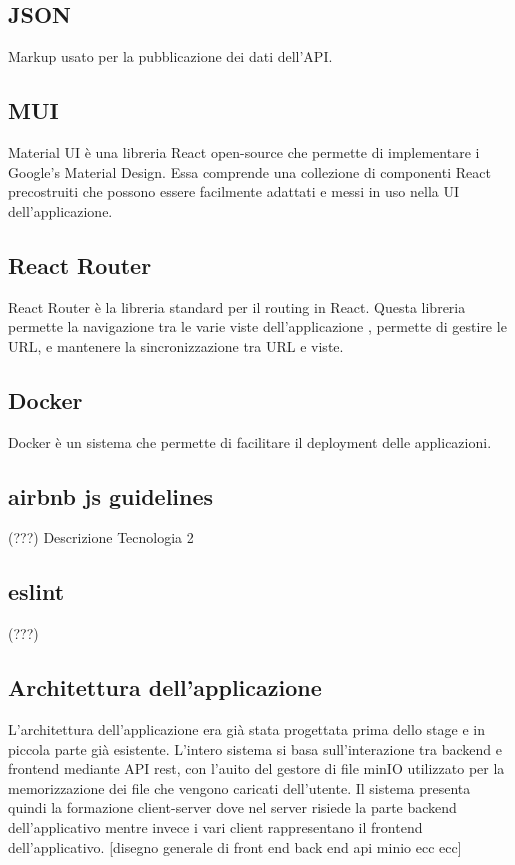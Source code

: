 \subsection*{JSON}
Markup usato per la pubblicazione dei dati dell’API.

\subsection*{MUI}
Material UI è una libreria React open-source che permette di implementare i Google's Material Design. Essa comprende una collezione di componenti React precostruiti che possono essere facilmente adattati e messi in uso nella UI dell'applicazione.

\subsection*{React Router}
React Router è la libreria standard per il routing in React. Questa libreria permette la navigazione tra le varie viste dell'applicazione , permette di gestire le URL, e mantenere la sincronizzazione tra URL e viste.

\subsection*{Docker}
Docker è un sistema che permette di facilitare il deployment delle applicazioni.

\subsection*{airbnb js guidelines} (???)
Descrizione Tecnologia 2

\subsection*{eslint} (???)

\subsection{Architettura dell'applicazione}
L'architettura dell'applicazione era già stata progettata prima dello stage e in piccola parte già esistente.
L'intero sistema si basa sull'interazione tra backend e frontend mediante API rest, con l'auito del gestore di file minIO utilizzato
per la memorizzazione dei file che vengono caricati dell'utente. Il sistema presenta quindi la formazione client-server dove nel server
risiede la parte backend dell'applicativo mentre invece i vari client rappresentano il frontend dell'applicativo.
[disegno generale di front end back end api minio ecc ecc]
